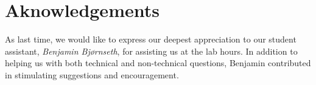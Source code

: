 \section{Aknowledgements}
As last time, we would like to express our deepest appreciation to our student assistant, \emph{Benjamin Bjørnseth}, for assisting us at the lab hours. In addition to helping us with both technical and non-technical questions, Benjamin contributed in stimulating suggestions and encouragement.
